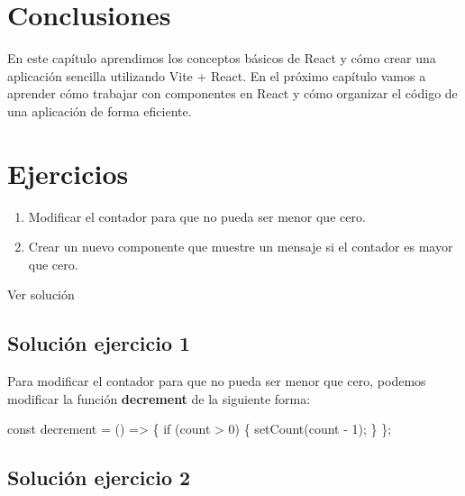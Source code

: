 \documentclass[
  a4paper,
  DIV=11,
  numbers=noendperiod,
  onepage,
  openany]{scrreprt}
\newenvironment{Shaded}{\begin{snugshade}}{\end{snugshade}}
\newcommand{\ControlFlowTok}[1]{\textcolor[rgb]{0.00,0.23,0.31}{#1}}
\newcommand{\DecValTok}[1]{\textcolor[rgb]{0.68,0.00,0.00}{#1}}
\newcommand{\FunctionTok}[1]{\textcolor[rgb]{0.28,0.35,0.67}{#1}}
\newcommand{\KeywordTok}[1]{\textcolor[rgb]{0.00,0.23,0.31}{#1}}
\newcommand{\NormalTok}[1]{\textcolor[rgb]{0.00,0.23,0.31}{#1}}
\newcommand{\OperatorTok}[1]{\textcolor[rgb]{0.37,0.37,0.37}{#1}}
\providecommand{\tightlist}{%
  \setlength{\itemsep}{0pt}\setlength{\parskip}{0pt}}\usepackage{longtable,booktabs,array}
\begin{document}
\section{Conclusiones}\label{conclusiones-7}

En este capítulo aprendimos los conceptos básicos de React y cómo crear
una aplicación sencilla utilizando Vite + React. En el próximo capítulo
vamos a aprender cómo trabajar con componentes en React y cómo organizar
el código de una aplicación de forma eficiente.

\section{Ejercicios}\label{ejercicios-1}

\begin{enumerate}
\def\labelenumi{\arabic{enumi}.}
\tightlist
\item
  Modificar el contador para que no pueda ser menor que cero.
\item
  Crear un nuevo componente que muestre un mensaje si el contador es
  mayor que cero.
\end{enumerate}

Ver solución

\subsection{Solución ejercicio 1}\label{soluciuxf3n-ejercicio-1}

Para modificar el contador para que no pueda ser menor que cero, podemos
modificar la función \textbf{decrement} de la siguiente forma:

\begin{Shaded}
\begin{Highlighting}[]
\KeywordTok{const}\NormalTok{ decrement }\OperatorTok{=}\NormalTok{ () }\KeywordTok{=\textgreater{}}\NormalTok{ \{}
  \ControlFlowTok{if}\NormalTok{ (count }\OperatorTok{\textgreater{}} \DecValTok{0}\NormalTok{) \{}
    \FunctionTok{setCount}\NormalTok{(count }\OperatorTok{{-}} \DecValTok{1}\NormalTok{)}\OperatorTok{;}
\NormalTok{  \}}
\NormalTok{\}}\OperatorTok{;}
\end{Highlighting}
\end{Shaded}

\subsection{Solución ejercicio 2}\label{soluciuxf3n-ejercicio-2}
\end{document}
